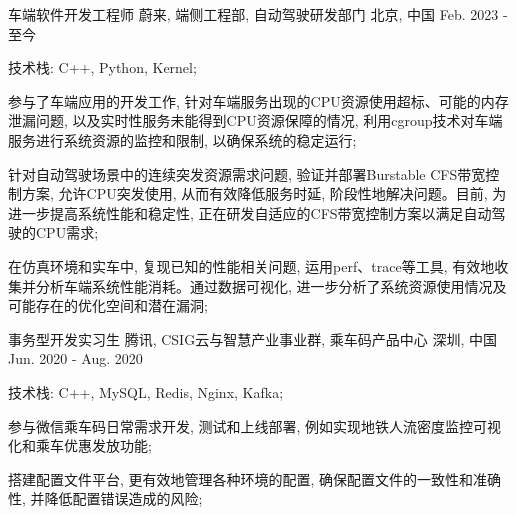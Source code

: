 

\begin{cventries}

\cventry
{车端软件开发工程师} %
{蔚来, 端侧工程部, 自动驾驶研发部门} %
{北京, 中国} %
{Feb. 2023 - 至今} %
{
  \begin{cvitems} %
    \item {技术栈: C++, Python, Kernel;}
    \item {参与了车端应用的开发工作, 针对车端服务出现的CPU资源使用超标、可能的内存泄漏问题, 以及实时性服务未能得到CPU资源保障的情况, 利用cgroup技术对车端服务进行系统资源的监控和限制, 以确保系统的稳定运行;}
    \item {针对自动驾驶场景中的连续突发资源需求问题, 验证并部署Burstable CFS带宽控制方案, 允许CPU突发使用, 从而有效降低服务时延, 阶段性地解决问题。目前, 为进一步提高系统性能和稳定性, 正在研发自适应的CFS带宽控制方案以满足自动驾驶的CPU需求;}
    \item {在仿真环境和实车中, 复现已知的性能相关问题, 运用perf、trace等工具, 有效地收集并分析车端系统性能消耗。通过数据可视化, 进一步分析了系统资源使用情况及可能存在的优化空间和潜在漏洞;}
  \end{cvitems}
}

  \cventry
    {事务型开发实习生} %
    {腾讯, CSIG云与智慧产业事业群, 乘车码产品中心} %
    {深圳, 中国} %
    {Jun. 2020 - Aug. 2020} %
    {
      \begin{cvitems} %
        \item {技术栈: C++, MySQL, Redis, Nginx, Kafka;}
        \item {参与微信乘车码日常需求开发, 测试和上线部署, 例如实现地铁人流密度监控可视化和乘车优惠发放功能;}
        \item {搭建配置文件平台, 更有效地管理各种环境的配置, 确保配置文件的一致性和准确性, 并降低配置错误造成的风险;}
      \end{cvitems}
    }


\end{cventries}
